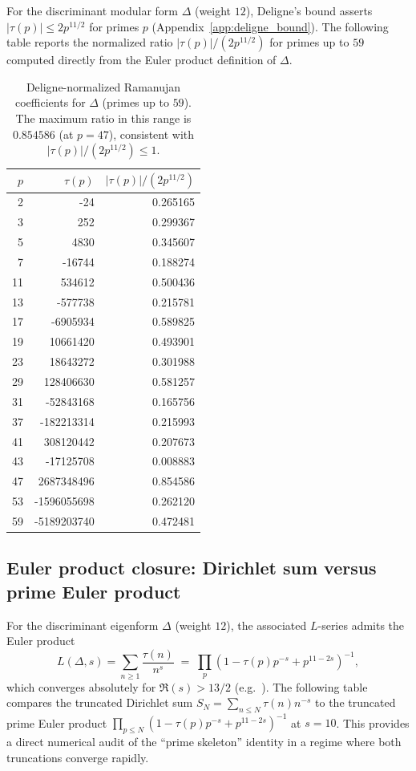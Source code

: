 For the discriminant modular form $\Delta$ (weight $12$), Deligne's bound asserts $|\tau(p)|\le 2p^{11/2}$ for primes $p$ (Appendix~\ref{app:deligne_bound}). The following table reports the normalized ratio $|\tau(p)|/(2p^{11/2})$ for primes up to $59$ computed directly from the Euler product definition of $\Delta$.

\begin{table}[H]
\centering
\begin{tabular}{rrr}
\toprule
$p$ & $\tau(p)$ & $|\tau(p)|/(2p^{11/2})$ \\
\midrule
2  & -24        & 0.265165 \\
3  & 252        & 0.299367 \\
5  & 4830       & 0.345607 \\
7  & -16744     & 0.188274 \\
11 & 534612     & 0.500436 \\
13 & -577738    & 0.215781 \\
17 & -6905934   & 0.589825 \\
19 & 10661420   & 0.493901 \\
23 & 18643272   & 0.301988 \\
29 & 128406630  & 0.581257 \\
31 & -52843168  & 0.165756 \\
37 & -182213314 & 0.215993 \\
41 & 308120442  & 0.207673 \\
43 & -17125708  & 0.008883 \\
47 & 2687348496 & 0.854586 \\
53 & -1596055698 & 0.262120 \\
59 & -5189203740 & 0.472481 \\
\bottomrule
\end{tabular}
\caption{Deligne-normalized Ramanujan coefficients for $\Delta$ (primes up to $59$). The maximum ratio in this range is $0.854586$ (at $p=47$), consistent with $|\tau(p)|/(2p^{11/2})\le 1$.}
\label{tab:tau_deligne_ratio}
\end{table}

\subsection{Euler product closure: Dirichlet sum versus prime Euler product}
\label{app:quant_fits_euler_product}

For the discriminant eigenform $\Delta$ (weight $12$), the associated $L$-series admits the Euler product
\begin{equation}
L(\Delta,s)=\sum_{n\ge 1}\frac{\tau(n)}{n^s}
\;=\;
\prod_{p}\left(1-\tau(p)p^{-s}+p^{11-2s}\right)^{-1},
\end{equation}
which converges absolutely for $\Re(s)>13/2$ (e.g.\ \cite{Serre1973,Apostol1990,DiamondShurman2005}). The following table compares the truncated Dirichlet sum $S_N=\sum_{n\le N}\tau(n)n^{-s}$ to the truncated prime Euler product $\prod_{p\le N}(1-\tau(p)p^{-s}+p^{11-2s})^{-1}$ at $s=10$. This provides a direct numerical audit of the ``prime skeleton'' identity in a regime where both truncations converge rapidly.

